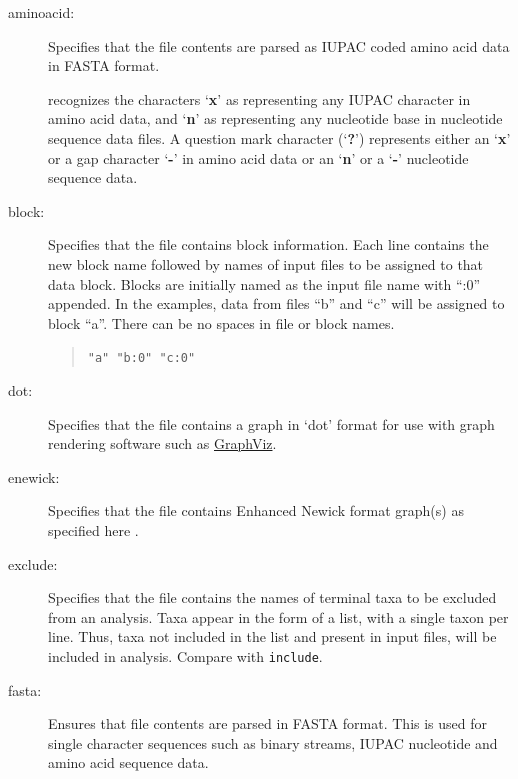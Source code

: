	\begin{description}
		\item [aminoacid:] Specifies that the file contents are parsed as IUPAC coded amino 
		acid data in FASTA \citep{PearsonandLipman1988} format.

		\begin{tcolorbox}[enhanced,fit to height=3cm,
  		colback=yellow!10!black!2!white,colframe=yellow!90!black,title=Note,
  		drop fuzzy shadow]
  		\phyg recognizes the characters `\textbf{x}' as representing any IUPAC character in amino
		acid data, and `\textbf{n}' as representing any nucleotide base in nucleotide sequence
		data files. A question mark character (`\textbf{?}') represents either an `\textbf{x}'  or a 
		gap character `\textbf{-}' in amino acid data or an `\textbf{n}' or a `\textbf{-}' nucleotide
		sequence data.
		\end{tcolorbox}

		\item [block:] Specifies that the file contains block %
		information. Each line contains 
		the new block name followed by names of input files to be assigned to that data block. 
		Blocks are initially named as the input file name with ``:0'' appended. In the examples, 
		data from files ``b'' and ``c'' will be assigned to block ``a''. There can be no spaces in 
		file or block names.
			
			\begin{quote}
			\texttt{"a" "b:0" "c:0"}
			\end{quote}
	
		\item [dot:] Specifies that the file contains a graph in `dot' format for use with graph 
		rendering software such as \href{https://en.wikipedia.org/wiki/Graphviz}{GraphViz}.

			
		\item [enewick:] Specifies that the file contains Enhanced Newick format graph(s) as
		specified here \citep{Cardonaetal2008}. 
			
		\item [exclude:] Specifies that the file contains the names of terminal taxa to be 
		excluded from an analysis. Taxa appear in the form of a list, with a single taxon per 
		line. Thus, taxa not included in the list and present in input files, will be included in 
		analysis. Compare with \texttt{include}.
			
		\item [fasta:] Ensures that file contents are parsed in FASTA \citep{PearsonandLipman1988}
		format. This is used for single character sequences such as binary streams, IUPAC 
		nucleotide and amino acid sequence data.
			

\end{description}
